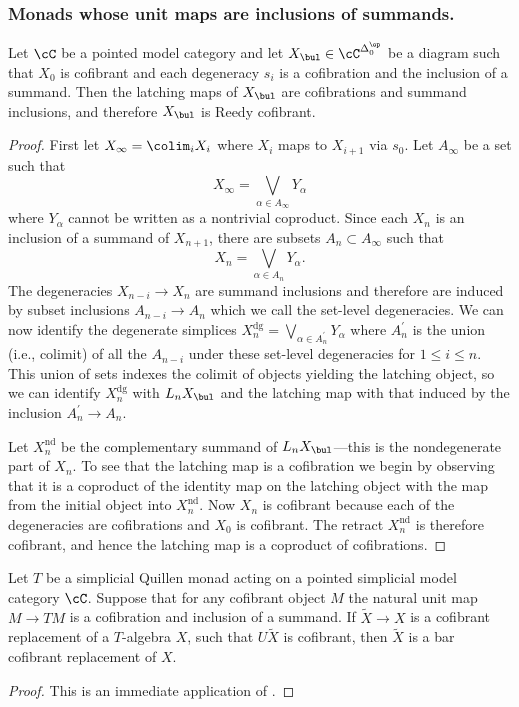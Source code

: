 \documentclass[leqno,oneside,english]{elsarticle}
\begin{document}
\subsubsection{Monads whose unit maps are inclusions of
summands.}

\begin{prop}\label{prop:summand-inclusion}
  Let $\cC$ be a pointed model category and
  let $X_{\bul} \in \cC^{\Delta^{\op}_{0}}$ be a diagram 
  such that $X_0$ is cofibrant and each degeneracy $s_i$
  is a cofibration and the inclusion of a summand.  Then the latching maps
  of $X_{\bul}$ are cofibrations and summand inclusions, and therefore
  $X_{\bul}$ is Reedy cofibrant.
\end{prop}
\begin{proof}
  First let $X_{\infty}=\colim_{i}X_i$ where $X_i$ maps to $X_{i+1}$ via
  $s_0$. Let $A_{\infty}$ be a set such that  
  \[
  X_{\infty}=\bigvee_{\alpha \in A_{\infty}} Y_\alpha
  \]  
  where $Y_\alpha$ cannot be written as a nontrivial coproduct.  Since
  each $X_n$ is an inclusion of a summand of $X_{n+1}$, there are
  subsets $A_n \subset A_\infty$ such that
  \[ 
  X_n = \bigvee_{\alpha \in A_n} Y_\alpha .
  \] 
  The degeneracies $X_{n-i} \to X_{n}$ are summand inclusions and
  therefore are induced by subset inclusions $A_{n-i} \to A_{n}$ which
  we call the set-level degeneracies.  We can now identify the
  degenerate simplices $X_n^{\mathrm{dg}}=\bigvee_{\alpha \in A_n^{\prime}}
  Y_\alpha$ where $A_n^{\prime}$ is the union (i.e., colimit) of all
  the $A_{n-i}$ under these set-level degeneracies for $1 \le i \le
  n$.  This union of sets indexes the colimit of objects yielding the
  latching object, so we can identify $X_{n}^{\mathrm{dg}}$ with $L_n X_{\bul}$
  and the latching map with that induced by the inclusion
  $A_{n}^\prime \rightarrow A_n$.

  Let $X_n^{\mathrm{nd}}$ be the complementary summand of $L_n
  X_\bul$---this is the nondegenerate part of $X_n$.  To see that the
  latching map is a cofibration we begin by observing that it is a
  coproduct of the identity map on the latching object with the map
  from the initial object into $X_n^{\mathrm{nd}}$.  Now $X_n$ is
  cofibrant because each of the degeneracies are cofibrations and
  $X_0$ is cofibrant.  The retract $X_n^{\mathrm{nd}}$ is therefore
  cofibrant, and hence the latching map is a coproduct of
  cofibrations.
\end{proof}

\begin{prop}\label{prop:summand-resolvable}
  Let $T$ be a simplicial Quillen monad acting on a pointed simplicial model category $\cC$.
  Suppose that for any cofibrant object $M$ the natural unit map $M
  \rightarrow TM$ is a cofibration and inclusion of a summand. If $\widetilde{X} \to X$ is a cofibrant replacement of  a $T$-algebra $X$, such that $U \widetilde{X}$ is cofibrant, then $\widetilde{X}$ is a bar cofibrant replacement of $X$.
\end{prop}
\begin{proof}
  This is an immediate application of .
\end{proof}
\end{document}
